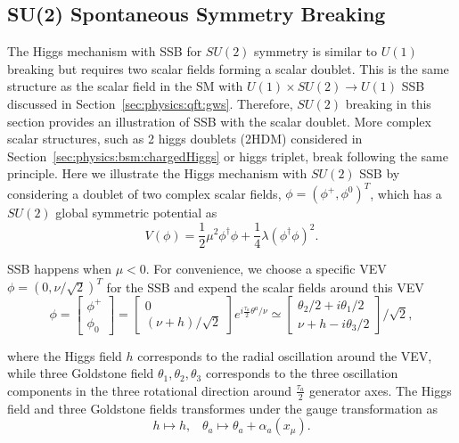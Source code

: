 \subsection{SU(2) Spontaneous Symmetry Breaking}
The Higgs mechanism with SSB for $SU(2)$ symmetry is similar to $U(1)$ breaking but requires two scalar fields forming a scalar doublet. This is the same structure as the scalar field in the SM with $U(1)\times SU(2) \to U(1)$ SSB discussed in Section~\ref{sec:physics:qft:gws}. Therefore,  $SU(2)$ breaking in this section provides an illustration of SSB with the scalar doublet. More complex scalar structures, such as 2 higgs doublets (2HDM) considered in Section~\ref{sec:physics:bsm:chargedHiggs} or higgs triplet, break following the same principle. Here we illustrate the Higgs mechanism with $SU(2)$ SSB by considering a doublet of two complex scalar fields, $\phi = (\phi^+, \phi^0)^T$, which has a $SU(2)$  global symmetric potential as
\begin{equation}
    V(\phi) = \frac{1}{2} \mu^2 \phi^\dagger\phi + \frac{1}{4} \lambda(\phi^\dagger\phi )^2.
\end{equation}

\noindent SSB happens when $\mu<0$. For convenience, we choose a specific VEV $\phi = (0, \nu/\sqrt{2})^T$ for the SSB and expend the scalar fields around this VEV
\begin{equation}
    \phi = \begin{bmatrix} \phi^+ \\ \phi_0 \end{bmatrix} =
    \begin{bmatrix} 0 \\ (\nu + h)/\sqrt{2} \end{bmatrix} e^{i \frac{\tau_a}{2} \theta^a  /\nu}
    \simeq \begin{bmatrix} \theta_2/2 + i\theta_1/2 \\ \nu + h - i\theta_3/2 \end{bmatrix} /\sqrt{2},
    \label{eqn:physics:qft:su2Higgs}
\end{equation}

\noindent where the Higgs field $h$ corresponds to the radial oscillation around the VEV, while three Goldstone field $\theta_1,\theta_2,\theta_3$ corresponds to the three oscillation components in the three rotational direction around $\frac{\tau_a}{2}$ generator axes. The Higgs field and three Goldstone fields transformes under the gauge transformation as 
\begin{equation}
    h  \longmapsto  h ,\;\;\; 
    \theta_a  \longmapsto  \theta_a + \alpha_a(x_\mu).
\end{equation}





